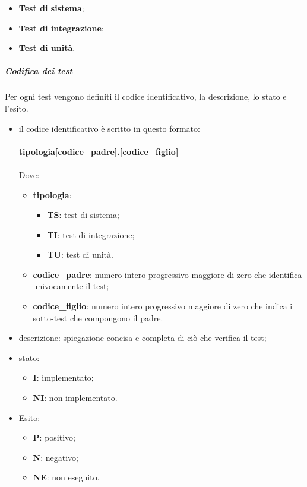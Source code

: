 \begin{itemize}
	\item \textbf{Test di sistema};
	\item \textbf{Test di integrazione};
	\item \textbf{Test di unità}.
\end{itemize}
\subparagraph*{Codifica dei test}
Per ogni test vengono definiti il codice identificativo, la descrizione, lo stato e l'esito.
\begin{itemize}
	\item il codice identificativo è scritto in questo formato:\\
	\\ \textbf{tipologia[codice\_padre].[codice\_figlio]} \\
	\\ Dove:
	\begin{itemize}
		\item \textbf{tipologia}:
		\begin{itemize}
			\item \textbf{TS}: test di sistema;
			\item \textbf{TI}: test di integrazione;
			\item \textbf{TU}: test di unità.
		\end{itemize}
		\item \textbf{codice\_padre}: numero intero progressivo maggiore di zero che identifica univocamente il test;
		\item \textbf{codice\_figlio}: numero intero progressivo maggiore di zero che indica i sotto-test che compongono il padre. 
	\end{itemize}
	\item descrizione: spiegazione concisa e completa di ciò che verifica il test;
	\item stato:
	\begin{itemize}
		\item \textbf{I}: implementato;
		\item \textbf{NI}: non implementato.
	\end{itemize}
	\item Esito:
	\begin{itemize}
		\item \textbf{P}: positivo;
		\item \textbf{N}: negativo;
		\item \textbf{NE}: non eseguito.
	\end{itemize}
\end{itemize}

